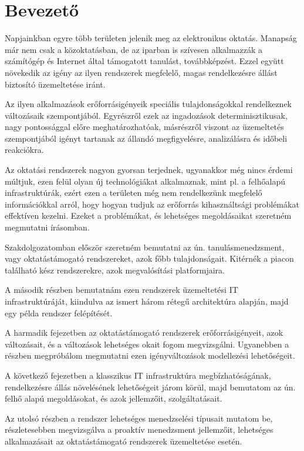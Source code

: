 \chapter*{Bevezető}

Napjainkban egyre több területen jelenik meg az elektronikus oktatás. Manapság már nem csak a közoktatásban, de az iparban is szívesen alkalmazzák a számítógép és Internet által támogatott tanulást, továbbképzést. Ezzel együtt növekedik az igény az ilyen rendszerek megfelelő, magas rendelkezésre állást biztosító üzemeltetése iránt.

Az ilyen alkalmazások erőforrásigényeik speciális tulajdonságokkal rendelkeznek változásaik szempontjából. Egyrészről ezek az ingadozások determinisztikusak, nagy pontossággal előre meghatározhatóak, másrészről viszont az üzemeltetés szempontjából igényt tartanak az állandó megfigyelésre, analizálásra és időbeli reakciókra.

Az oktatási rendszerek nagyon gyorsan terjednek, ugyanakkor még nincs érdemi múltjuk, ezen felül olyan új technológiákat alkalmaznak, mint pl. a felhőalapú infrastruktúrák, ezért ezen a területen még nem rendelkezünk megfelelő információkkal arról, hogy hogyan tudjuk az erőforrás kihasználtsági problémákat effektíven kezelni. Ezeket a problémákat, és lehetséges megoldásaikat szeretném megmutatni írásomban.

Szakdolgozatomban először szeretném bemutatni az ún. tanulásmenedzsment, vagy oktatástámogató rendszereket, azok főbb tulajdonságait. Kitérnék a piacon található kész rendszerekre, azok megvalósítási platformjaira.

A második részben bemutatnám ezen rendszerek üzemeltetési IT infrastruktúráját, kiindulva az ismert három rétegű architektúra alapján, majd egy példa rendszer felépítését.

A harmadik fejezetben az oktatástámogató rendszerek erőforrásigényeit, azok változásait, és a változások lehetséges okait fogom megvizsgálni. Ugyanebben a részben megpróbálom megmutatni ezen igényváltozások modellezési lehetőségeit.

A következő fejezetben a klasszikus IT infrastruktúra megbízhatóságának, rendelkezésre állás növelésének lehetőségeit járom körül, majd bemutatom az ún. felhő alapú megoldásokat, és azok jellemzőit, szolgáltatásait.

Az utolsó részben a rendszer lehetséges menedzselési típusait mutatom be, részletesebben megvizsgálva a proaktív menedzsment jellemzőit, lehetséges alkalmazásait az oktatástámogató rendszerek üzemeltetése esetén.
 